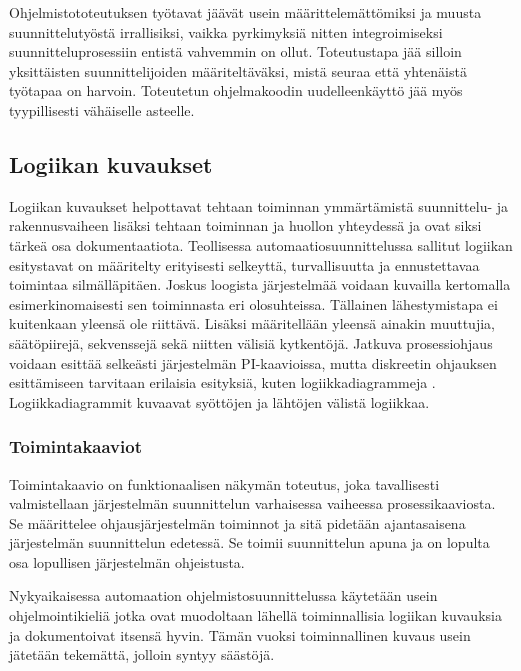 \documentclass[finnish,12pt]{article}
\begin{document}
Ohjelmistototeutuksen työtavat jäävät usein määrittelemättömiksi ja muusta suunnittelutyöstä irrallisiksi,
vaikka pyrkimyksiä nitten integroimiseksi suunnitteluprosessiin entistä vahvemmin on ollut.
Toteutustapa jää silloin yksittäisten suunnittelijoiden määriteltäväksi, mistä seuraa että yhtenäistä työtapaa on harvoin.
Toteutetun ohjelmakoodin uudelleenkäyttö jää myös tyypillisesti vähäiselle asteelle. \cite{RefWorks:42}


	\subsection{Logiikan kuvaukset}

Logiikan kuvaukset helpottavat tehtaan toiminnan ymmärtämistä suunnittelu- ja rakennusvaiheen lisäksi tehtaan toiminnan ja huollon yhteydessä ja ovat siksi tärkeä osa dokumentaatiota.
Teollisessa automaatiosuunnittelussa sallitut logiikan esitystavat on määritelty erityisesti selkeyttä, turvallisuutta ja ennustettavaa toimintaa silmälläpitäen.
Joskus loogista järjestelmää voidaan kuvailla kertomalla esimerkinomaisesti sen toiminnasta eri olosuhteissa.
Tällainen lähestymistapa ei kuitenkaan yleensä ole riittävä.
Lisäksi määritellään yleensä ainakin muuttujia, säätöpiirejä, sekvenssejä sekä niitten välisiä kytkentöjä.\cite{RefWorks:41}
Jatkuva prosessiohjaus voidaan esittää selkeästi järjestelmän PI-kaavioissa, mutta diskreetin ohjauksen esittämiseen tarvitaan erilaisia esityksiä, kuten logiikkadiagrammeja \cite{RefWorks:54}. 
Logiikkadiagrammit kuvaavat syöttöjen ja lähtöjen välistä logiikkaa.

		\subsubsection{Toimintakaaviot}

Toimintakaavio on funktionaalisen näkymän toteutus, joka tavallisesti valmistellaan järjestelmän suunnittelun varhaisessa vaiheessa prosessikaaviosta.
Se määrittelee ohjausjärjestelmän toiminnot ja sitä pidetään ajantasaisena järjestelmän suunnittelun edetessä.
Se toimii suunnittelun apuna ja on lopulta osa lopullisen järjestelmän ohjeistusta.

Nykyaikaisessa automaation ohjelmistosuunnittelussa käytetään usein ohjelmointikieliä jotka ovat muodoltaan lähellä toiminnallisia logiikan kuvauksia ja dokumentoivat itsensä hyvin.
Tämän vuoksi toiminnallinen kuvaus usein jätetään tekemättä, jolloin syntyy säästöjä. \cite{RefWorks:41}
\end{document}
